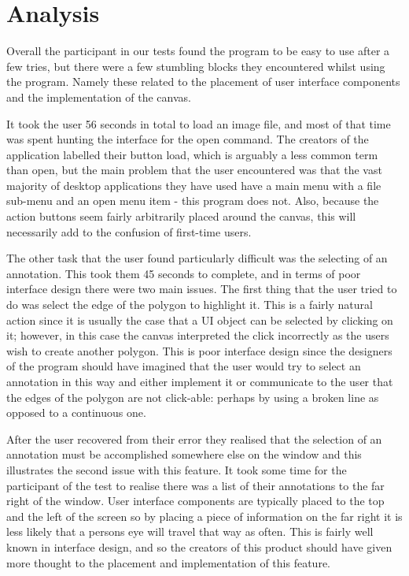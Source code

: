 \section{Analysis}

Overall the participant in our tests found the program to be easy to use after a few tries, but there were a few stumbling blocks they encountered whilst using the program.  Namely these related to the placement of user interface components and the implementation of the canvas.

It took the user 56 seconds in total to load an image file, and most of that time was spent hunting the interface for the open command.  The creators of the application labelled their button load, which is arguably a less common term than open, but the main problem that the user encountered was that the vast majority of desktop applications they have used have a main menu with a file sub-menu and an open menu item - this program does not.  Also, because the action buttons seem fairly arbitrarily placed around the canvas, this will necessarily add to the confusion of first-time users.

The other task that the user found particularly difficult was the selecting of an annotation.  This took them 45 seconds to complete, and in terms of poor interface design there were two main issues.  The first thing that the user tried to do was select the edge of the polygon to highlight it.  This is a fairly natural action since it is usually the case that a UI object can be selected by clicking on it; however, in this case the canvas interpreted the click incorrectly as the users wish to create another polygon.  This is poor interface design since the designers of the program should have imagined that the user would try to select an annotation in this way and either implement it or communicate to the user that the edges of the polygon are not click-able: perhaps by using a broken line as opposed to a continuous one. 

After the user recovered from their error they realised that the selection of an annotation must be accomplished somewhere else on the window and this illustrates the second issue with this feature. It took some time for the participant of the test to realise there was a list of their annotations to the far right of the window.  User interface components are typically placed to the top and the left of the screen so by placing a piece of information on the far right it is less likely that a persons eye will travel that way as often.  This is fairly well known in interface design, and so the creators of this product should have given more thought to the placement and implementation of this feature.
